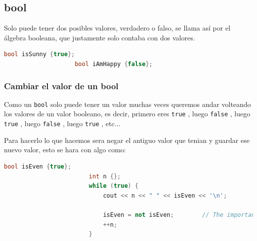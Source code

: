 \documentclass[12pt, fleqn]{report}                             %
\theoremstyle{break}                                            %
\newcommand{\textCode}[1]  { \texttt{#1} }                      %
\begin{document}
            \subsection{bool}

                Solo puede tener dos posibles valores, verdadero o falso, se llama así por el álgebra
                booleana, que justamente solo contaba con dos valores.
                \begin{lstlisting}[language=C++, gobble=20]
                    bool isSunny {true};
                    bool iAmHappy {false};
                \end{lstlisting}

                \subsubsection{Cambiar el valor de un bool}

                    Como un \textCode{bool} solo puede tener un valor muchas veces queremos andar volteando
                    los valores de un valor booleano, es decir, primero eres \textCode{true}, luego
                    \textCode{false}, luego \textCode{true}, luego \textCode{false}, luego \textCode{true}, 
                    etc...

                    Para hacerlo lo que hacemos sera negar el antiguo valor que tenian y guardar ese nuevo valor,
                    esto se hara con algo como:
                    \begin{lstlisting}[language=C++, gobble=24]
                        bool isEven {true};
                        int n {};
                        while (true) {
                            cout << n << " " << isEven << '\n';

                            isEven = not isEven;        // The important line
                            ++n;
                        }
                    \end{lstlisting}


        \clearpage
\end{document}
